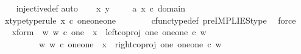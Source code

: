 \begin{isabellebody}
%
\isadelimproof
\ \ %
\endisadelimproof
%
\isatagproof
{}\isamarkupfalse%
\ injective{\isacharunderscore}{\kern0pt}def\isanewline
{}\isamarkupfalse%
{\isacharparenleft}{\kern0pt}auto{\isacharparenright}{\kern0pt}\isanewline
\ \ \isamarkupfalse%
\ x\ y\ \isanewline
\ \ \isamarkupfalse%
\ a{}{\isacharcolon}{\kern0pt}\ {\isachardoublequoteopen}x\ {\isasymin}\isactrlsub c\ domain\ {\isacharparenleft}{\kern0pt}{\isasymlangle}{\isasymt}{\isacharcomma}{\kern0pt}{\isasymt}{\isasymrangle}\ {\isasymamalg}\ {\isasymlangle}{\isasymf}{\isacharcomma}{\kern0pt}\ {\isasymf}{\isasymrangle}\ {\isasymamalg}\ {\isasymlangle}{\isasymf}{\isacharcomma}{\kern0pt}{\isasymt}{\isasymrangle}{\isacharparenright}{\kern0pt}{\isachardoublequoteclose}\ \isanewline
\ \ \isamarkupfalse%
\ \isamarkupfalse%
\ x{\isacharunderscore}{\kern0pt}type{\isacharbrackleft}{\kern0pt}type{\isacharunderscore}{\kern0pt}rule{\isacharbrackright}{\kern0pt}{\isacharcolon}{\kern0pt}\ {\isachardoublequoteopen}x\ {\isasymin}\isactrlsub c\ {\isacharparenleft}{\kern0pt}one{\isasymCoprod}{\isacharparenleft}{\kern0pt}one{\isasymCoprod}one{\isacharparenright}{\kern0pt}{\isacharparenright}{\kern0pt}{\isachardoublequoteclose}\ \ \isanewline
\ \ \ \ \isamarkupfalse%
\ cfunc{\isacharunderscore}{\kern0pt}type{\isacharunderscore}{\kern0pt}def\ pre{\isacharunderscore}{\kern0pt}IMPLIES{\isacharunderscore}{\kern0pt}type\ \isamarkupfalse%
\ force\isanewline
\ \ \isamarkupfalse%
\ \isamarkupfalse%
\ x{\isacharunderscore}{\kern0pt}form{\isacharcolon}{\kern0pt}\ {\isachardoublequoteopen}{\isacharparenleft}{\kern0pt}{\isasymexists}\ w{\isachardot}{\kern0pt}\ {\isacharparenleft}{\kern0pt}w\ {\isasymin}\isactrlsub c\ one\ {\isasymand}\ x\ {\isacharequal}{\kern0pt}\ {\isacharparenleft}{\kern0pt}left{\isacharunderscore}{\kern0pt}coproj\ one\ {\isacharparenleft}{\kern0pt}one{\isasymCoprod}one{\isacharparenright}{\kern0pt}{\isacharparenright}{\kern0pt}\ {\isasymcirc}\isactrlsub c\ w{\isacharparenright}{\kern0pt}{\isacharparenright}{\kern0pt}\isanewline
\ \ \ \ \ \ {\isasymor}\ \ {\isacharparenleft}{\kern0pt}{\isasymexists}\ w{\isachardot}{\kern0pt}\ {\isacharparenleft}{\kern0pt}w\ {\isasymin}\isactrlsub c\ {\isacharparenleft}{\kern0pt}one{\isasymCoprod}one{\isacharparenright}{\kern0pt}\ {\isasymand}\ x\ {\isacharequal}{\kern0pt}\ {\isacharparenleft}{\kern0pt}right{\isacharunderscore}{\kern0pt}coproj\ one\ {\isacharparenleft}{\kern0pt}one{\isasymCoprod}one{\isacharparenright}{\kern0pt}{\isacharparenright}{\kern0pt}\ {\isasymcirc}\isactrlsub c\ w{\isacharparenright}{\kern0pt}{\isacharparenright}{\kern0pt}{\isachardoublequoteclose}\isanewline

\end{isabellebody}

